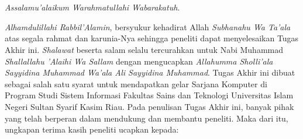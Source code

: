 %
%
%
%

\chapter*{\kataPengantar}

\textit{Assalamu’alaikum Warahmatullahi Wabarakatuh}.

\textit{Alhamdulillahi Rabbil’Alamin}, bersyukur kehadirat Allah \textit{Subhanahu Wa Ta’ala} atas segala rahmat dan karunia-Nya sehingga peneliti dapat menyelesaikan Tugas Akhir ini. \textit{Shalawat} beserta salam selalu tercurahkan untuk Nabi Muhammad \textit{Shallallahu ’Alaihi Wa Sallam} dengan mengucapkan \textit{Allahumma Sholli’ala Sayyidina Muhammad Wa’ala Ali Sayyidina Muhammad}. Tugas Akhir ini dibuat sebagai salah satu syarat untuk mendapatkan gelar Sarjana Komputer di Program Studi Sistem Informasi Fakultas Sains dan Teknologi Universitas Islam Negeri Sultan Syarif Kasim Riau. Pada penulisan Tugas Akhir ini, banyak pihak yang telah berperan dalam mendukung dan membantu peneliti. Maka dari itu, ungkapan terima kasih peneliti ucapkan kepada:

